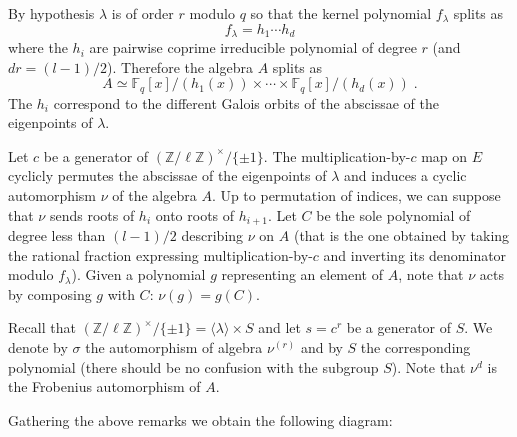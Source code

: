 \documentclass[12pt]{article}
\theoremstyle{plain}
\theoremstyle{definition}
\def\Z{\ensuremath{\mathbb{Z}}}
\def\F{\ensuremath{\mathbb{F}}}
\begin{document}
By hypothesis $\lambda$ is of order $r$ modulo $q$ so that
the kernel polynomial $f_\lambda$ splits as
\[
f_\lambda = h_1 \cdots h_d
\]
where the $h_i$ are pairwise coprime irreducible polynomial of degree $r$
(and $d r = (l-1)/2$).
Therefore the algebra $A$ splits as
\[
A \simeq \F_q[x]/(h_1(x)) \times \cdots \times \F_q[x]/(h_d(x)) \; .
\]
The $h_i$ correspond to the different Galois orbits of the abscissae
of the eigenpoints of $\lambda$.

Let $c$ be a generator of $(\Z/\ell\Z)^{\times}/\{\pm 1\}$.
The multiplication-by-$c$ map on $E$ cyclicly permutes the
abscissae of the eigenpoints of $\lambda$ and
induces a cyclic automorphism $\nu$ of the algebra $A$.
Up to permutation of indices, we can suppose that $\nu$
sends roots of $h_i$ onto roots of $h_{i+1}$.
Let $C$ be the sole polynomial of degree less than $(l-1)/2$
describing $\nu$ on $A$ (that is the one obtained by taking the
rational fraction expressing multiplication-by-$c$ and inverting
its denominator modulo $f_\lambda$).
Given a polynomial $g$ representing an element of $A$, note that
$\nu$ acts by composing $g$ with $C$: $\nu(g) = g(C)$.

Recall that
$(\Z/\ell\Z)^{\times}/\{\pm 1\} = \langle{\lambda}\rangle \times S$
and let $s = c^r$ be a generator of $S$.
We denote by $\sigma$ the automorphism of algebra $\nu^{(r)}$
and by $S$ the corresponding polynomial
(there should be no confusion with the subgroup $S$).
Note that $\nu^d$ is the Frobenius automorphism of $A$.

Gathering the above remarks we obtain the following diagram:
\begin{center}
\end{center}
\end{document}
